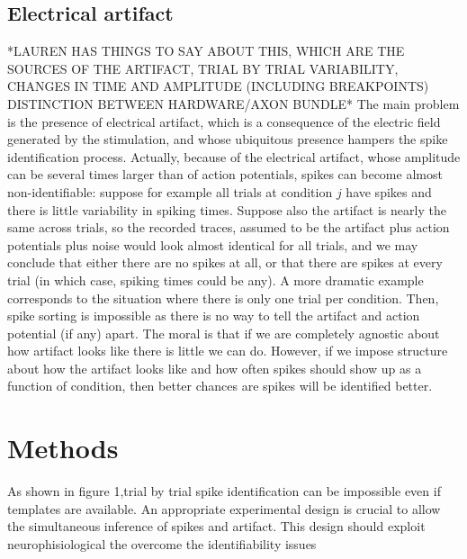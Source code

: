 \documentclass[12pt,letterpaper,fleqn]{article}
\begin{document}
\subsection{Electrical artifact}
*LAUREN HAS THINGS TO SAY ABOUT THIS, WHICH ARE THE SOURCES OF THE ARTIFACT, TRIAL BY TRIAL VARIABILITY,  CHANGES IN TIME AND AMPLITUDE (INCLUDING BREAKPOINTS) DISTINCTION BETWEEN HARDWARE/AXON BUNDLE*
 The main problem is the presence of electrical artifact, which is a consequence of the electric field generated by the stimulation, and whose ubiquitous presence hampers the spike identification process. Actually, because of the electrical artifact, whose amplitude can be several times larger than of action potentials, spikes can become almost non-identifiable: suppose for example all trials at condition $j$ have spikes and there is little variability in spiking times. Suppose also the artifact is nearly the same across trials, so the recorded traces, assumed to be the artifact plus action potentials plus noise would look almost identical for all trials, and we may conclude that either there are no spikes at all, or that there are spikes at every trial (in which case, spiking times could be any). A more dramatic example corresponds to the situation where there is only one trial per condition. Then, spike sorting is impossible as there is no way to tell the artifact and action potential (if any) apart. The moral is that if we are completely agnostic about how artifact looks like there is little we can do. However, if we impose structure about how the artifact looks like and how often spikes should show up as a function of condition, then better chances are spikes will be identified better.   
\section{Methods}

As shown in figure 1,trial by trial spike identification can be impossible even if templates are available. An appropriate experimental design is crucial to allow the simultaneous inference of spikes and artifact. This design should exploit neurophisiological the overcome the identifiability issues
\end{document}
